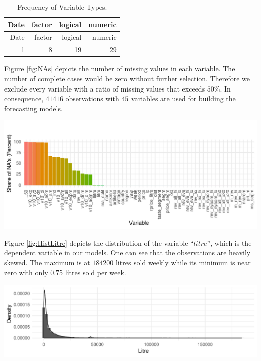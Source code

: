 \documentclass[11pt,]{article}
\let\origfigure\figure
\let\endorigfigure\endfigure
\renewenvironment{figure}[1][2] {
    \expandafter\origfigure\expandafter[H]
} {
    \endorigfigure
}
\begin{document}
\begin{longtable}[]{@{}rrrr@{}}
\caption{\label{tab:VarTyp}Frequency of Variable Types.}\tabularnewline
\toprule
Date & factor & logical & numeric\tabularnewline
\midrule
\endfirsthead
\toprule
Date & factor & logical & numeric\tabularnewline
\midrule
\endhead
1 & 8 & 19 & 29\tabularnewline
\bottomrule
\end{longtable}

Figure \ref{fig:NAs} depicts the number of missing values in each
variable. The number of complete cases would be zero without further
selection. Therefore we exclude every variable with a ratio of missing
values that exceeds \(50\%\). In consequence, \(41416\) observations
with \(45\) variables are used for building the forecasting models.

\begin{figure}
\centering
\includegraphics{../00_data/output_paper/02_missings_alt.pdf}
\caption{\label{fig:NAs}Share of Missing Values in the Wine Dataset.}
\end{figure}

Figure \ref{fig:HistLitre} depicts the distribution of the variable
\enquote{\(litre\)}, which is the dependent variable in our models. One
can see that the observations are heavily skewed. The maximum is at
\(184200\) litres sold weekly while its minimum is near zero with only
\(0.75\) litres sold per week.

\begin{figure}
\centering
\includegraphics{../00_data/output_paper/04_hist_litre.pdf}
\caption{\label{fig:HistLitre}Histogram and Estimated Density of the
Litre Variable.}
\end{figure}
\end{document}
